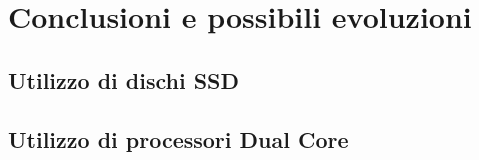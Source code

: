 \chapter{Conclusioni e possibili evoluzioni}
\section{Utilizzo di dischi SSD}
\section{Utilizzo di processori Dual Core}